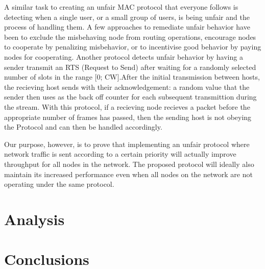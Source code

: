 \documentclass{sigcomm-alternate}
\begin{document}
A similar task to creating an unfair MAC protocol that everyone follows is detecting when a single user, or a small group of users, is being unfair and the process of handling them. A few approaches to remediate unfair behavior have been to exclude the misbehaving node from routing operations, encourage nodes to cooperate by penalizing misbehavior, or to incentivise good behavior by paying nodes for cooperating. Another protocol detects unfair behavior by having a sender transmit an RTS (Request to Send) after waiting for a randomly selected number of slots in the range [0; CW].After the initial transmission between hosts, the recieving host sends with their acknowledgement: a random value that the sender then uses as the back off counter for each subsequent transmittion during the stream. \cite{Kyasanur} With this protocol, if a recieving node recieves a packet before the appropriate number of frames has passed, then the sending host is not obeying the Protocol and can then be handled accordingly.

Our purpose, however, is to prove that implementing an unfair protocol where network traffic is sent according to a certain priority will actually improve throughput for all nodes in the network. The proposed protocol will ideally also maintain its increased performance even when all nodes on the network are not operating under the same protocol. 


\section{Analysis}
\label{section:analysis}

\section{Conclusions}
\label{section:conclusions}



\balancecolumns
\end{document}
